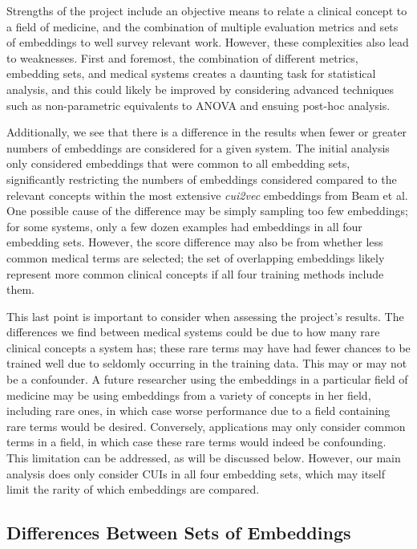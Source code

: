 \documentclass[10pt]{article}
\begin{document}
Strengths of the project include an objective means to relate a clinical concept to a field of medicine, and the combination of multiple evaluation metrics and sets of embeddings to well survey relevant work. However, these complexities also lead to weaknesses. First and foremost, the combination of different metrics, embedding sets, and medical systems creates a daunting task for statistical analysis, and this could likely be improved by considering advanced techniques such as non-parametric equivalents to ANOVA and ensuing post-hoc analysis. 

Additionally, we see that there is a difference in the results when fewer or greater numbers of embeddings are considered for a given system. The initial analysis only considered embeddings that were common to all embedding sets, significantly restricting the numbers of embeddings considered compared to the relevant concepts within the most extensive \emph{cui2vec} embeddings from Beam et al. One possible cause of the difference may be simply sampling too few embeddings; for some systems, only a few dozen examples had embeddings in all four embedding sets. However, the score difference may also be from whether less common medical terms are selected; the set of overlapping embeddings likely represent more common clinical concepts if all four training methods include them. 

This last point is important to consider when assessing the project's results. The differences we find between medical systems could be due to how many rare clinical concepts a system has; these rare terms may have had fewer chances to be trained well due to seldomly occurring in the training data. This may or may not be a confounder. A future researcher using the embeddings in a particular field of medicine may be using embeddings from a variety of concepts in her field, including rare ones, in which case worse performance due to a field containing rare terms would be desired. Conversely, applications may only consider common terms in a field, in which case these rare terms would indeed be confounding. This limitation can be addressed, as will be discussed below. However, our main analysis does only consider CUIs in all four embedding sets, which may itself limit the rarity of which embeddings are compared. 

\subsection{Differences Between Sets of Embeddings}
\end{document}
